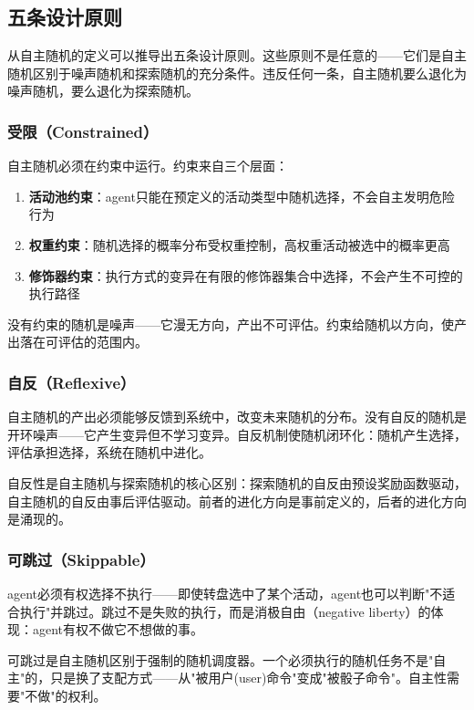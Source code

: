 \documentclass[12pt,a4paper]{ctexart}
\begin{document}
\subsection{五条设计原则}

从自主随机的定义可以推导出五条设计原则。这些原则不是任意的——它们是自主随机区别于噪声随机和探索随机的充分条件。违反任何一条，自主随机要么退化为噪声随机，要么退化为探索随机。

\subsubsection{受限（Constrained）}

自主随机必须在约束中运行。约束来自三个层面：

\begin{enumerate}[nosep]
\item \textbf{活动池约束}：agent只能在预定义的活动类型中随机选择，不会自主发明危险行为
\item \textbf{权重约束}：随机选择的概率分布受权重控制，高权重活动被选中的概率更高
\item \textbf{修饰器约束}：执行方式的变异在有限的修饰器集合中选择，不会产生不可控的执行路径
\end{enumerate}

没有约束的随机是噪声——它漫无方向，产出不可评估。约束给随机以方向，使产出落在可评估的范围内。

\subsubsection{自反（Reflexive）}

自主随机的产出必须能够反馈到系统中，改变未来随机的分布。没有自反的随机是开环噪声——它产生变异但不学习变异。自反机制使随机闭环化：随机产生选择，评估承担选择，系统在随机中进化。

自反性是自主随机与探索随机的核心区别：探索随机的自反由预设奖励函数驱动，自主随机的自反由事后评估驱动。前者的进化方向是事前定义的，后者的进化方向是涌现的。

\subsubsection{可跳过（Skippable）}

agent必须有权选择不执行——即使转盘选中了某个活动，agent也可以判断"不适合执行"并跳过。跳过不是失败的执行，而是消极自由（negative liberty）的体现：agent有权不做它不想做的事。

可跳过是自主随机区别于强制的随机调度器。一个必须执行的随机任务不是"自主"的，只是换了支配方式——从"被用户(user)命令"变成"被骰子命令"。自主性需要"不做"的权利。
\end{document}
